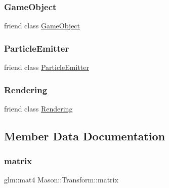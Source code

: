 \subsubsection{\texorpdfstring{Game\+Object}{GameObject}}
{\footnotesize\ttfamily friend class \hyperlink{class_mason_1_1_game_object}{Game\+Object}\hspace{0.3cm}{\ttfamily [friend]}}

\hypertarget{class_mason_1_1_transform_a82b374d797a09668286ac5cf26f539f3}{}\label{class_mason_1_1_transform_a82b374d797a09668286ac5cf26f539f3} 
\subsubsection{\texorpdfstring{Particle\+Emitter}{ParticleEmitter}}
{\footnotesize\ttfamily friend class \hyperlink{class_mason_1_1_particle_emitter}{Particle\+Emitter}\hspace{0.3cm}{\ttfamily [friend]}}

\hypertarget{class_mason_1_1_transform_a33061a25b8332281d02c83e2bf1d4959}{}\label{class_mason_1_1_transform_a33061a25b8332281d02c83e2bf1d4959} 
\subsubsection{\texorpdfstring{Rendering}{Rendering}}
{\footnotesize\ttfamily friend class \hyperlink{class_mason_1_1_rendering}{Rendering}\hspace{0.3cm}{\ttfamily [friend]}}



\subsection{Member Data Documentation}
\hypertarget{class_mason_1_1_transform_aeb64a62787375e23645da6f490763c25}{}\label{class_mason_1_1_transform_aeb64a62787375e23645da6f490763c25} 
\subsubsection{\texorpdfstring{matrix}{matrix}}
{\footnotesize\ttfamily glm\+::mat4 Mason\+::\+Transform\+::matrix\hspace{0.3cm}{\ttfamily [protected]}}

